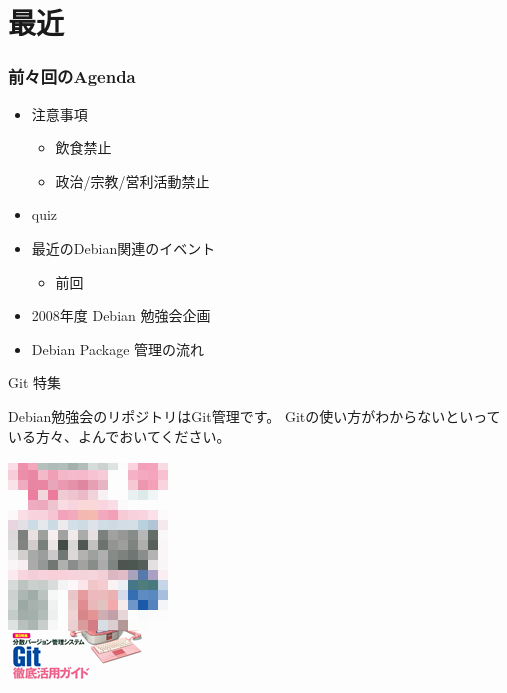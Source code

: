 \documentclass[cjk,dvipdfmx,12pt]{beamer}
\begin{document}
\section{最近}

\begin{frame}
 \frametitle{前々回のAgenda}
\begin{minipage}[t]{0.45\hsize}
  \begin{itemize}
  \item 注意事項
	\begin{itemize}
	 \item 飲食禁止
	 \item 政治/宗教/営利活動禁止
	\end{itemize}
  \item quiz
  \item 最近のDebian関連のイベント
	\begin{itemize}
	 \item 前回
	\end{itemize}
 \end{itemize}
\end{minipage} 
\begin{minipage}[t]{0.45\hsize}
 \begin{itemize}
  \item 2008年度 Debian 勉強会企画
  \item Debian Package 管理の流れ
 \end{itemize}
\end{minipage}
\end{frame}


\begin{frame}{Git 特集}

Debian勉強会のリポジトリはGit管理です。
Gitの使い方がわからないといっている方々、よんでおいてください。

\includegraphics[width=0.4\hsize]{image200803/gihyo200804.jpg}

\end{frame}
\end{document}
